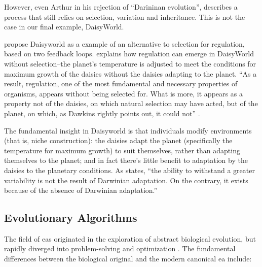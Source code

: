 However, even Arthur in his rejection of ``Darininan evolution'', describes a process that still relies on selection, variation and inheritance. This is not the case in our final example, DaisyWorld.

\Textcite{LovelockMargulis2011} propose Daisyworld as a example of an alternative to selection for regulation, based on two feedback loops. \Textcite{Saunders1994} explains how regulation can emerge in DaisyWorld without selection--the planet's temperature is adjusted to meet the conditions for maximum growth of the daisies without the daisies adapting to the planet. ``As a result, regulation, one of the most fundamental and necessary properties of organisms, appears without being selected for. What is more, it appears as a property not of the daisies, on which natural selection may have acted, but of the planet, on which, as Dawkins rightly points out, it could not'' \parencite{Saunders1994}.

The fundamental insight in Daisyworld is that individuals modify environments (that is, niche construction): the daisies adapt the planet (specifically the temperature for maximum growth) to suit themselves, rather than adapting themselves to the planet; and in fact there's little benefit to adaptation by the daisies to the planetary conditions. As \textcite{Saunders1994} states, ``the ability to withstand a greater variability is not the result of Darwinian adaptation. On the contrary, it exists because of the absence of Darwinian adaptation.''

\subsection{Evolutionary Algorithms}

The field of \glspl{ea} originated in the exploration of abstract biological evolution, but rapidly diverged into problem-solving and optimization \parencite{De-Jong:1993gy,DeJong2006}. The fundamental differences between the biological original and the modern canonical \gls{ea} include:

